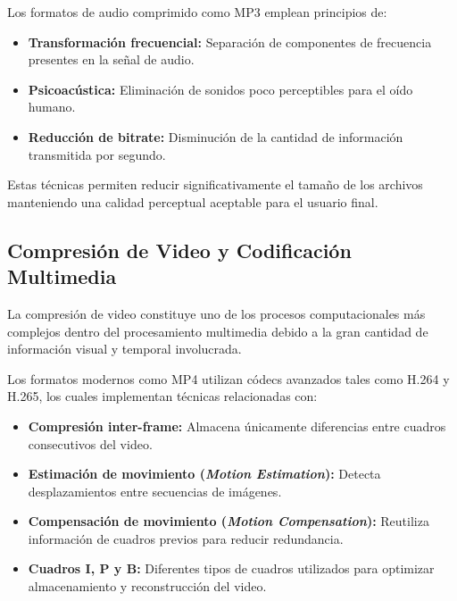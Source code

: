 \documentclass[12pt, oneside, letterpaper]{book}
\begin{document}
Los formatos de audio comprimido como MP3 emplean principios de:

\begin{itemize}

\item \textbf{Transformación frecuencial:} Separación de componentes de frecuencia presentes en la señal de audio.

\item \textbf{Psicoacústica:} Eliminación de sonidos poco perceptibles para el oído humano.

\item \textbf{Reducción de bitrate:} Disminución de la cantidad de información transmitida por segundo.
\end{itemize}

Estas técnicas permiten reducir significativamente el tamaño de los archivos manteniendo una calidad perceptual aceptable para el usuario final.

\subsection{Compresión de Video y Codificación Multimedia}

La compresión de video constituye uno de los procesos computacionales más complejos dentro del procesamiento multimedia debido a la gran cantidad de información visual y temporal involucrada.

Los formatos modernos como MP4 utilizan códecs avanzados tales como H.264 y H.265, los cuales implementan técnicas relacionadas con:

\begin{itemize}

\item \textbf{Compresión inter-frame:} Almacena únicamente diferencias entre cuadros consecutivos del video.

\item \textbf{Estimación de movimiento (\textit{Motion Estimation}):} Detecta desplazamientos entre secuencias de imágenes.

\item \textbf{Compensación de movimiento (\textit{Motion Compensation}):} Reutiliza información de cuadros previos para reducir redundancia.

\item \textbf{Cuadros I, P y B:} Diferentes tipos de cuadros utilizados para optimizar almacenamiento y reconstrucción del video.
\end{itemize}
\end{document}
